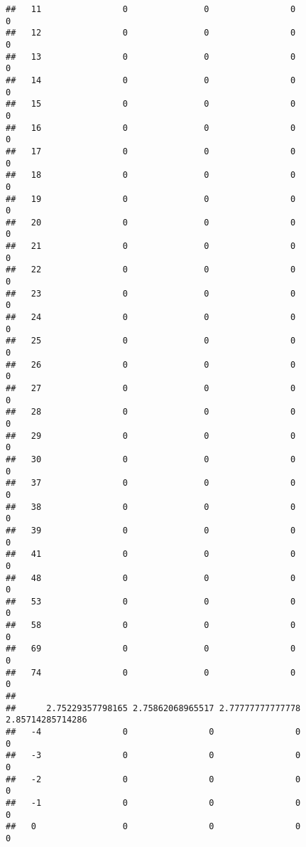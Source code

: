 \documentclass[]{article}
\begin{document}
\begin{verbatim}
##   11                0               0                0                0
##   12                0               0                0                0
##   13                0               0                0                0
##   14                0               0                0                0
##   15                0               0                0                0
##   16                0               0                0                0
##   17                0               0                0                0
##   18                0               0                0                0
##   19                0               0                0                0
##   20                0               0                0                0
##   21                0               0                0                0
##   22                0               0                0                0
##   23                0               0                0                0
##   24                0               0                0                0
##   25                0               0                0                0
##   26                0               0                0                0
##   27                0               0                0                0
##   28                0               0                0                0
##   29                0               0                0                0
##   30                0               0                0                0
##   37                0               0                0                0
##   38                0               0                0                0
##   39                0               0                0                0
##   41                0               0                0                0
##   48                0               0                0                0
##   53                0               0                0                0
##   58                0               0                0                0
##   69                0               0                0                0
##   74                0               0                0                0
##     
##      2.75229357798165 2.75862068965517 2.77777777777778 2.85714285714286
##   -4                0                0                0                0
##   -3                0                0                0                0
##   -2                0                0                0                0
##   -1                0                0                0                0
##   0                 0                0                0                0

\end{verbatim}
\end{document}
